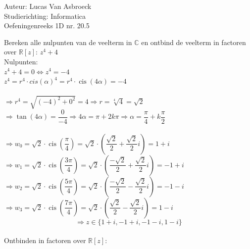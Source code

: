 \documentclass[a4paper]{article}
\begin{document}
\noindent \large Auteur: Lucas Van Asbroeck \\
\noindent \large Studierichting: Informatica\\
\noindent \large Oefeningenreeks 1D nr. 20.5\\

\medskip

\normalsize

Bereken alle nulpunten van de veelterm in $\mathbb{C}$ en ontbind de veelterm in factoren over $\mathbb{R}[z]$: $z^4 + 4$\\

Nulpunten:\\

$z^4 + 4 = 0 \Leftrightarrow z^4 = -4$\\

$z^4 = r^4\cdot cis(\alpha)^4 = r^4 \cdot  \operatorname{cis}(4\alpha) = -4$\\\\

$\Rightarrow r^4 = \sqrt{(-4)^2 + 0^2} = 4 \Rightarrow r = \sqrt[4]{4} = \sqrt{2}$ \\

$\Rightarrow \tan(4\alpha) = \dfrac{0}{-4} \Rightarrow 4\alpha = \pi + 2k\pi \Rightarrow \alpha = \dfrac{\pi}{4} + k\dfrac{\pi}{2}$\\\\


$\Rightarrow w_0 = \sqrt{2}\cdot \operatorname{cis}\left(\dfrac{\pi}{4}\right) = \sqrt{2}\cdot  \left(\dfrac{\sqrt{2}}{2} + \dfrac{\sqrt{2}}{2}i \right) = 1 + i$ \\

$\Rightarrow w_1 = \sqrt{2}\cdot \operatorname{cis}\left(\dfrac{3\pi}{4}\right) = \sqrt{2}\cdot  \left(\dfrac{-\sqrt{2}}{2} + \dfrac{\sqrt{2}}{2}i \right) = -1 + i$ \\

$\Rightarrow w_2 = \sqrt{2}\cdot \operatorname{cis}\left(\dfrac{5\pi}{4}\right) = \sqrt{2}\cdot  \left(\dfrac{-\sqrt{2}}{2} - \dfrac{\sqrt{2}}{2}i \right) = -1 - i$ \\

$\Rightarrow w_3 = \sqrt{2}\cdot \operatorname{cis}\left(\dfrac{7\pi}{4}\right) = \sqrt{2}\cdot  \left(\dfrac{\sqrt{2}}{2} - \dfrac{\sqrt{2}}{2}i \right) = 1 - i$ \\

$$\Rightarrow \boxed{ z \in \{1+i,-1+i,-1-i,1-i\}}$$\\

Ontbinden in factoren over $\mathbb{R}[z]$:\\
\end{document}
